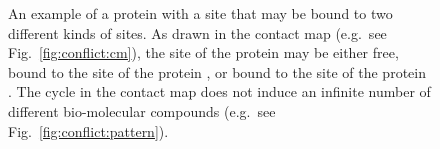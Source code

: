 \documentclass{entcs}
\begin{document}
\begin{figure}
{\begin{minipage}{0.74\linewidth}
  \hspace*{3mm}%
  \hspace*{3mm}%
  \hspace*{3mm}%
  \hspace*{3mm}%

\end{minipage}}
\caption{An example of a protein with a site that may be bound to two different kinds of sites. As drawn in the contact map (e.g.~see Fig.~\ref{fig:conflict:cm}), the site of the protein  may be either free, bound to the site  of the protein , or bound to the site  of the protein . The cycle in the contact map does not induce an infinite number of different bio-molecular compounds (e.g.~see Fig.~\ref{fig:conflict:pattern}). }
\end{figure}
\end{document}
